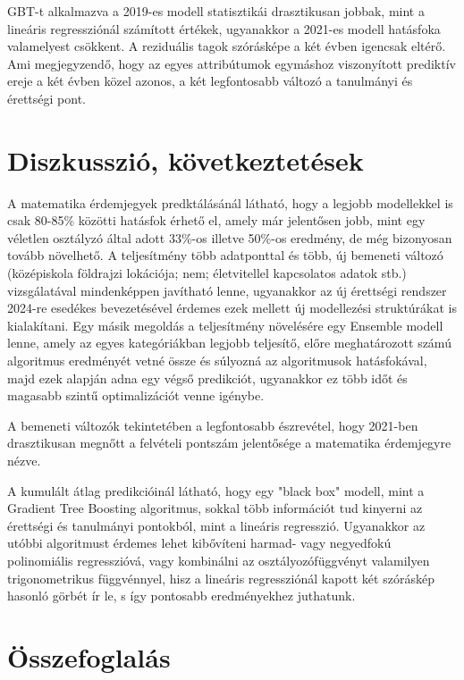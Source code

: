 \documentclass[12pt]{article}
\begin{document}
\noindent GBT-t alkalmazva a 2019-es modell statisztikái drasztikusan jobbak, mint a lineáris regressziónál számított értékek, ugyanakkor a 2021-es modell hatásfoka valamelyest csökkent. A reziduális tagok szórásképe a két évben igencsak eltérő. Ami megjegyzendő, hogy az egyes attribútumok egymáshoz viszonyított prediktív ereje a két évben közel azonos, a két legfontosabb változó a tanulmányi és érettségi pont. 

\newpage 

\section{Diszkusszió, következtetések}

A matematika érdemjegyek predktálásánál látható, hogy a legjobb modellekkel is csak 80-85\% közötti hatásfok érhető el, amely már jelentősen jobb, mint egy véletlen osztályzó által adott 33\%-os illetve 50\%-os eredmény, de még bizonyosan tovább növelhető. A teljesítmény több adatponttal és több, új bemeneti változó (középiskola földrajzi lokációja; nem; életvitellel kapcsolatos adatok stb.) vizsgálatával mindenképpen javítható lenne, ugyanakkor az új érettségi rendszer 2024-re esedékes bevezetésével érdemes ezek mellett új modellezési struktúrákat is kialakítani. Egy másik megoldás a teljesítmény növelésére egy Ensemble modell lenne, amely az egyes kategóriákban legjobb teljesítő, előre meghatározott számú algoritmus eredményét vetné össze és súlyozná az algoritmusok hatásfokával, majd ezek alapján adna egy végső predikciót, ugyanakkor ez több időt és magasabb szintű optimalizációt venne igénybe. 

A bemeneti változók tekintetében a legfontosabb észrevétel, hogy 2021-ben drasztikusan megnőtt a felvételi pontszám jelentősége a matematika érdemjegyre nézve.

A kumulált átlag predikcióinál látható, hogy egy "black box" modell, mint a Gradient Tree Boosting algoritmus, sokkal több információt tud kinyerni az érettségi és tanulmányi pontokból, mint a lineáris regresszió. Ugyanakkor az utóbbi algoritmust érdemes lehet kibővíteni harmad- vagy negyedfokú polinomiális regresszióvá, vagy kombinálni az osztályozófüggvényt valamilyen trigonometrikus függvénnyel, hisz a lineáris regressziónál kapott két szóráskép hasonló görbét ír le, s így pontosabb eredményekhez juthatunk.



\section{Összefoglalás}



\begin{thebibliography}{9}
\end{thebibliography}
\end{document}
